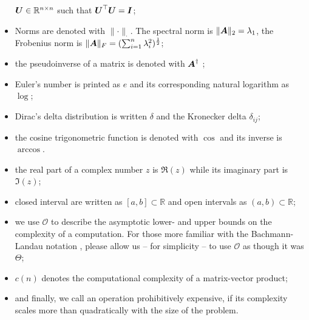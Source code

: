 \begin{itemize}
          $\boldsymbol{U} \in \mathbb{R}^{n \times n}$ such that $\boldsymbol{U}^{\top} \boldsymbol{U} = \boldsymbol{I}$;
    \item Norms are denoted with $\lVert \cdot \rVert _{\cdot}$. The spectral norm is
          $\lVert \boldsymbol{A} \rVert _2 = \lambda_1$, the Frobenius norm
          is $\lVert \boldsymbol{A} \rVert _F = (\sum_{i=1}^{n} \lambda_i^2)^{\frac{1}{2}}$;
    \item the pseudoinverse of a matrix is denoted with $\boldsymbol{A}^{\dagger}$ \cite{penrose1955pseudo};
    \item Euler's number is printed as $e$ and its corresponding natural logarithm as $\log$;
    \item Dirac's delta distribution is written $\delta$ \cite[chapter~15]{dirac1947quantum}
          and the Kronecker delta $\delta_{ij}$;
    \item the cosine trigonometric function is denoted with $\cos$ and its inverse is $\arccos$.
    \item the real part of a complex number $z$ is $\Re(z)$ while its imaginary part is $\Im(z)$;
    \item closed interval are written as $[a, b] \subset \mathbb{R}$ and open
          intervals as $(a, b) \subset \mathbb{R}$;
    \item we use $\mathcal{O}$ to describe the asymptotic lower- and upper bounds
          on the complexity of a computation. For those more familiar with the
          Bachmann-Landau notation \cite[section~3.2]{cormen2009algorithms},
          please allow us -- for simplicity -- to use $\mathcal{O}$ as though it was $\Theta$;
    \item $c(n)$ denotes the computational complexity of a matrix-vector product;
    \item and finally, we call an operation prohibitively expensive, if its
          complexity scales more than quadratically with the size of the problem.
\end{itemize}
